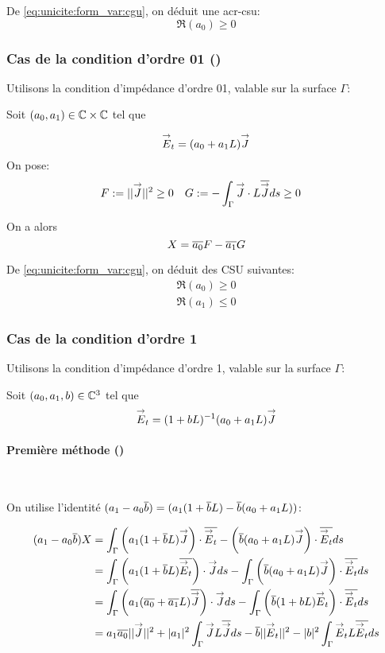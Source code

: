 De \eqref{eq:unicite:form_var:cgu}, on déduit une \gls{acr-csu}:
\begin{equation}
\Re\left(a_0\right) \ge 0
\end{equation}

\subsubsection{Cas de la condition d'ordre 01 (\cite{stupfel_sufficient_2011})}
Utilisons la condition d’impédance d'ordre 01, valable sur la surface $\Gamma$:

Soit $(a_0, a_1) \in \mathbb C\times\mathbb C$ tel que

\[
{\overset{\rightarrow}{E}}_t = (a_0 +a_1L){\overset{\rightarrow}{J}}
\]
On pose:
\begin{align*}
F&:= || {\overset{\rightarrow}{J}}|| ^2 \ge 0  & G&:= -\int_\Gamma {\overset{\rightarrow}{J}}\cdot L{\overline{{\overset{\rightarrow}{J}}}} ds \ge 0
\end{align*}

On a alors
\begin{equation*}
X = {\overline{a_0}}F - {\overline{a_1}}G
\end{equation*}

De \eqref{eq:unicite:form_var:cgu}, on déduit des CSU suivantes:
\begin{align}
\Re\left(a_0\right) \ge 0\\
\Re\left(a_1\right) \le 0
\end{align}
\subsubsection{Cas de la condition d'ordre 1}


Utilisons la condition d’impédance d'ordre 1, valable sur la surface $\Gamma$: 

Soit $(a_0, a_1,b) \in \mathbb C^3$ tel que
\[
{\overset{\rightarrow}{E}}_t = (1 + b L)^{-1} (a_0 + a_1 L) {\overset{\rightarrow}{J}}
\]

\paragraph{Première méthode (\cite{stupfel_sufficient_2011})}~

On utilise l'identité $(a_1-a_0{\overline{b}}) = (a_1(1+{\overline{b}}L) - {\overline{b}}(a_0+a_1L))$:

\begin{align*}
(a_1-a_0{\overline{b}})X &= \int_\Gamma \left(a_1(1+{\overline{b}}L) {\overset{\rightarrow}{J}}\right)\cdot{\overline{{\overset{\rightarrow}{E}}_t}} - \left({\overline{b}}(a_0+a_1L){\overset{\rightarrow}{J}}\right)\cdot{\overline{{\overset{\rightarrow}{E}}_t}} ds\\
&= \int_\Gamma \left(a_1(1+{\overline{b}}L) {\overline{{\overset{\rightarrow}{E}}_t}}\right)\cdot{\overset{\rightarrow}{J}} ds - \int_\Gamma \left({\overline{b}}(a_0+a_1L){\overset{\rightarrow}{J}}\right)\cdot{\overline{{\overset{\rightarrow}{E}}_t}} ds\\
&= \int_\Gamma \left(a_1({\overline{a_0}}+{\overline{a_1}}L) {\overline{{\overset{\rightarrow}{J}}}}\right)\cdot{\overset{\rightarrow}{J}} ds  - \int_\Gamma \left({\overline{b}}(1+bL){\overset{\rightarrow}{E}}_t\right)\cdot{\overline{{\overset{\rightarrow}{E}}_t}} ds\\
&= a_1{\overline{a_0}} ||{\overset{\rightarrow}{J}}||^2 + |a_1|^2 \int_\Gamma {\overset{\rightarrow}{J}} L {\overline{{\overset{\rightarrow}{J}}}} ds - {\overline{b}} ||{\overset{\rightarrow}{E}}_t||^2 - |b|^2 \int_\Gamma {\overset{\rightarrow}{E}}_t L {\overline{{\overset{\rightarrow}{E}}_t}} ds
\end{align*}

